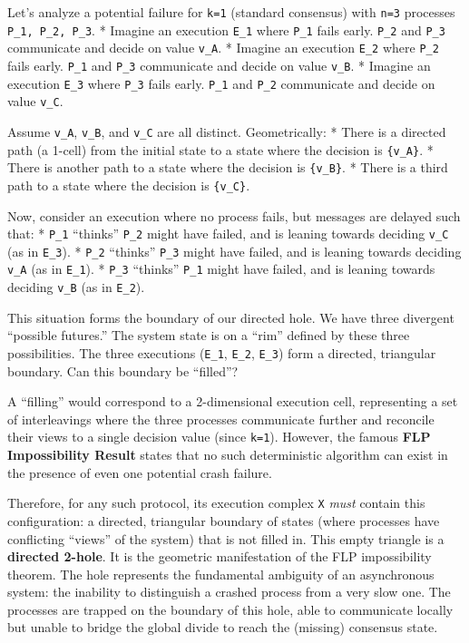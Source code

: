 \documentclass[
]{article}
\begin{document}
Let's analyze a potential failure for \texttt{k=1} (standard consensus)
with \texttt{n=3} processes \texttt{P\_1,\ P\_2,\ P\_3}. * Imagine an
execution \texttt{E\_1} where \texttt{P\_1} fails early. \texttt{P\_2}
and \texttt{P\_3} communicate and decide on value \texttt{v\_A}. *
Imagine an execution \texttt{E\_2} where \texttt{P\_2} fails early.
\texttt{P\_1} and \texttt{P\_3} communicate and decide on value
\texttt{v\_B}. * Imagine an execution \texttt{E\_3} where \texttt{P\_3}
fails early. \texttt{P\_1} and \texttt{P\_2} communicate and decide on
value \texttt{v\_C}.

Assume \texttt{v\_A}, \texttt{v\_B}, and \texttt{v\_C} are all distinct.
Geometrically: * There is a directed path (a 1-cell) from the initial
state to a state where the decision is \texttt{\{v\_A\}}. * There is
another path to a state where the decision is \texttt{\{v\_B\}}. * There
is a third path to a state where the decision is \texttt{\{v\_C\}}.

Now, consider an execution where no process fails, but messages are
delayed such that: * \texttt{P\_1} ``thinks'' \texttt{P\_2} might have
failed, and is leaning towards deciding \texttt{v\_C} (as in
\texttt{E\_3}). * \texttt{P\_2} ``thinks'' \texttt{P\_3} might have
failed, and is leaning towards deciding \texttt{v\_A} (as in
\texttt{E\_1}). * \texttt{P\_3} ``thinks'' \texttt{P\_1} might have
failed, and is leaning towards deciding \texttt{v\_B} (as in
\texttt{E\_2}).

This situation forms the boundary of our directed hole. We have three
divergent ``possible futures.'' The system state is on a ``rim'' defined
by these three possibilities. The three executions (\texttt{E\_1},
\texttt{E\_2}, \texttt{E\_3}) form a directed, triangular boundary. Can
this boundary be ``filled''?

A ``filling'' would correspond to a 2-dimensional execution cell,
representing a set of interleavings where the three processes
communicate further and reconcile their views to a single decision value
(since \texttt{k=1}). However, the famous \textbf{FLP Impossibility
Result} states that no such deterministic algorithm can exist in the
presence of even one potential crash failure.

Therefore, for any such protocol, its execution complex \texttt{X}
\emph{must} contain this configuration: a directed, triangular boundary
of states (where processes have conflicting ``views'' of the system)
that is not filled in. This empty triangle is a \textbf{directed
2-hole}. It is the geometric manifestation of the FLP impossibility
theorem. The hole represents the fundamental ambiguity of an
asynchronous system: the inability to distinguish a crashed process from
a very slow one. The processes are trapped on the boundary of this hole,
able to communicate locally but unable to bridge the global divide to
reach the (missing) consensus state.
\end{document}
